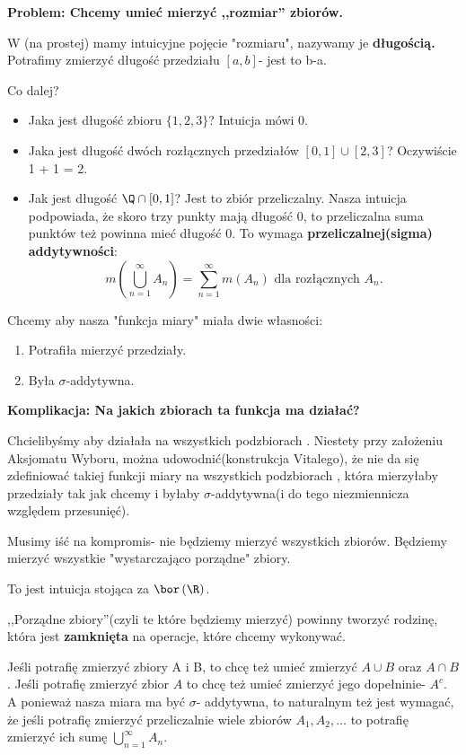 \begin{remark}
	\textbf{Problem: Chcemy umieć mierzyć ,,rozmiar'' zbiorów.}

	W  \R(na prostej) mamy intuicyjne pojęcie "rozmiaru", nazywamy je \textbf{długością.} Potrafimy zmierzyć długość przedziału $[a,b]$- jest to b-a.

	Co dalej?
 	\begin{itemize}
 		\item Jaka jest długość zbioru $\{1,2,3\} $? Intuicja mówi 0.
		\item Jaka jest długość dwóch rozłącznych przedziałów $[0,1] \cup [2,3]$? Oczywiście 1 + 1 = 2.
		\item Jak jest długość $\Q\cap [0,1]$? Jest to zbiór przeliczalny. Nasza intuicja podpowiada, że skoro trzy punkty mają długość 0, to przeliczalna suma punktów też powinna mieć długość 0. To wymaga  \textbf{przeliczalnej(sigma) addytywności}:
			\[
			m\left( \bigcup_{n=1}^{\infty} A_{n} \right) = \sum_{n=1}^{\infty} m\left( A_{n} \right)\text{ dla rozłącznych } A_{n}
			.\]
 	\end{itemize}

	Chcemy aby nasza "funkcja miary" miała dwie własności:
	\begin{enumerate}[label=\alph*)]
		\item Potrafiła mierzyć przedziały.
		\item Była $\sigma$-addytywna.
	\end{enumerate}

	\textbf{Komplikacja: Na jakich zbiorach ta funkcja ma działać?}  

	Chcielibyśmy aby działała na wszystkich podzbiorach \R. Niestety przy założeniu Aksjomatu Wyboru, można udowodnić(konstrukcja Vitalego), że nie da się zdefiniować takiej funkcji miary na wszystkich podzbiorach \R, która mierzyłaby przedziały tak jak chcemy i byłaby $\sigma$-addytywna(i do tego niezmiennicza względem przesunięć).

	Musimy iść na kompromis- nie będziemy mierzyć wszystkich zbiorów. Będziemy mierzyć wszystkie "wystarczająco porządne" zbiory. 

	To jest intuicja stojąca za $\bor\left(\R\right) $.

	,,Porządne zbiory''(czyli te które będziemy mierzyć) powinny tworzyć rodzinę, która jest \textbf{zamknięta} na operacje, które chcemy wykonywać.

	Jeśli potrafię zmierzyć zbiory A i B, to chcę też umieć zmierzyć $A\cup B$ oraz $A\cap B$. Jeśli potrafię zmierzyć zbior $A$ to chcę też umieć zmierzyć jego dopełninie- $A^{c}$. A ponieważ nasza miara ma być  $\sigma$- addytywna, to naturalnym też jest wymagać, że jeśli potrafię zmierzyć przeliczalnie wiele zbiorów $A_1,A_2,\ldots$ to potrafię zmierzyć ich sumę $\bigcup_{n=1} ^{\infty}A_{n}$.


\end{remark}
